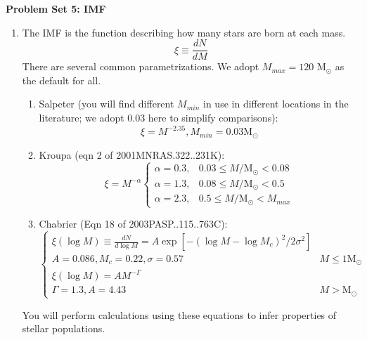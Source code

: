 \documentclass{article}
\newcommand{\msun}{\ensuremath{\mathrm{M}_\odot}\xspace}
\begin{document}
\noindent\textbf{Problem Set 5: IMF}

\begin{enumerate}
    \item The IMF is the function describing how many stars are born at each mass.
        \begin{equation}
            \xi \equiv \frac{dN}{dM}
        \end{equation}
        There are several common parametrizations.  We adopt $M_{max} = 120$ \msun
        as the default for all.
        \begin{enumerate}
            \item Salpeter (you will find different $M_{min}$ in use in
                different locations in the literature; we adopt 0.03 here
                to simplify comparisons):
            \begin{equation}
                \xi = M^{-2.35}, M_{min}=0.03 \msun
            \end{equation}

            \item Kroupa (eqn 2 of 2001MNRAS.322..231K):\\
            $$ \xi = M^{-\alpha}
            \begin{cases}
                  \alpha=0.3, & 0.03 \leq M/\msun < 0.08 \\
                  \alpha=1.3, & 0.08 \leq M/\msun < 0.5 \\
                  \alpha=2.3, & 0.5 \leq M/\msun < M_{max}
            \end{cases}
            $$

            \item Chabrier (Eqn 18 of 2003PASP..115..763C):\\
                $$
            \begin{cases}
                \xi(\log M) \equiv \frac{dN}{d\log M} = A \exp\left[-(\log M - \log M_c)^2/2\sigma^2\right]  \\
                A = 0.086, M_c = 0.22, \sigma=0.57 &  M\leq1 \msun\\
                \xi(\log M) = A M^{-\Gamma}   \\
                \Gamma = 1.3, A = 4.43 & M>\msun
            \end{cases}
            $$


        \end{enumerate}

    You will perform calculations using these equations to infer properties of stellar
    populations.


\end{enumerate}
\end{document}

